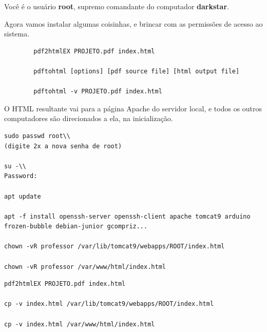 \begin{multicols}{2}
Você é o usuário \textbf{root}, supremo comandante do computador \textbf{darkstar}.

Agora vamos instalar algumas coisinhas, e brincar com as permissões de acesso ao sistema.


	\begin{lstlisting}
		pdf2htmlEX PROJETO.pdf index.html
		
		pdftohtml [options] [pdf source file] [html output file]
		
		pdftohtml -v PROJETO.pdf index.html
	\end{lstlisting}
	
	
	O HTML resultante vai para a página Apache do servidor local, e todos os outros computadores são direcionados a ela, na inicialização.
	
	\begin{lstlisting}
sudo passwd root\\
(digite 2x a nova senha de root)
		
su -\\
Password:
		
apt update
		
apt -f install openssh-server openssh-client apache tomcat9 arduino frozen-bubble debian-junior gcompriz...
		
chown -vR professor /var/lib/tomcat9/webapps/ROOT/index.html
		
chown -vR professor /var/www/html/index.html
	\end{lstlisting}
	
	\begin{lstlisting}
pdf2htmlEX PROJETO.pdf index.html
		
cp -v index.html /var/lib/tomcat9/webapps/ROOT/index.html
		
cp -v index.html /var/www/html/index.html
	\end{lstlisting}
	
\end{multicols}





